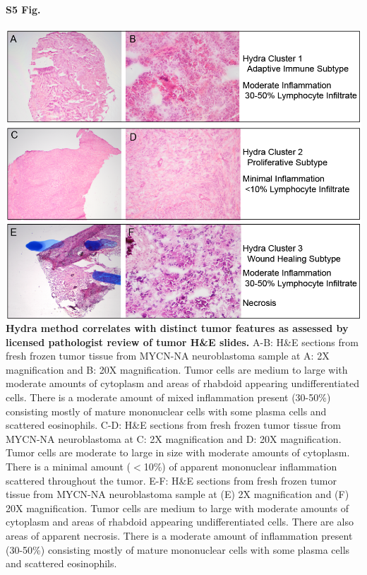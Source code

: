 \documentclass[10pt,letterpaper]{article}
\begin{document}
\paragraph*{S5 Fig.}
\includegraphics[width=\textwidth]{img/PNG/HE-Figure-3-Clusters-2x}
\label{S5_Fig} {\bf Hydra method correlates with distinct tumor features as assessed by licensed pathologist review of tumor H\&E slides.}
A-B: H\&E sections from fresh frozen tumor tissue from MYCN-NA neuroblastoma sample at A: 2X magnification and B: 20X magnification. Tumor cells are medium to large with moderate amounts of cytoplasm and areas of rhabdoid appearing undifferentiated cells.  There is a moderate amount of mixed inflammation present (30-50\%) consisting mostly of mature mononuclear cells with some plasma cells and scattered eosinophils. C-D: H\&E sections from fresh frozen tumor tissue from MYCN-NA neuroblastoma at C: 2X magnification and D: 20X magnification. Tumor cells are moderate to large in size with moderate amounts of cytoplasm. There is a minimal amount ($<$10\%) of apparent mononuclear inflammation scattered throughout the tumor. E-F: H\&E sections from fresh frozen tumor tissue from MYCN-NA neuroblastoma sample at (E) 2X magnification and (F) 20X magnification.  Tumor cells are medium to large with moderate amounts of cytoplasm and areas of rhabdoid appearing undifferentiated cells.  There are also areas of apparent necrosis.  There is a moderate amount of inflammation present (30-50\%) consisting mostly of mature mononuclear cells with some plasma cells and scattered eosinophils.
\end{document}
